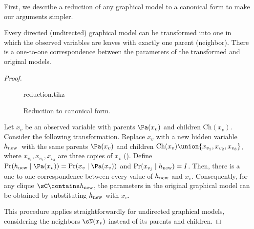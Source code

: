 


First, we describe a reduction of any graphical model to
  a canonical form to make our arguments simpler.

\begin{lemma}
  \label{lem:reduction}
Every directed (undirected) graphical model can be transformed into one in which
  the observed variables are leaves with exactly one parent (neighbor). 
There is a one-to-one correspondence between the parameters of the
  transformed and original models.
\end{lemma}
\begin{proof}
  \begin{figure}
    \centering
    {reduction.tikz}
    \caption{Reduction to canonical form.}
    \label{fig:reduction}
  \end{figure}

  \providecommand{\hp}{\ensuremath{h_\text{\rm new}}}
  Let $x_v$ be an observed variable with parents $\Pa(x_v)$ and children $\text{Ch}(x_v)$.
  Consider the following transformation.
  Replace $x_v$ with a new hidden variable \hp\ with the same
  parents $\Pa(x_v)$ and children $\text{Ch}(x_v) \union \{x_{v_1}, x_{v_2}, x_{v_3}\}$,
  where $x_{v_1},x_{v_2},x_{v_3}$ are three copies of $x_v$
  ().
  Define $\Pr(\hp \mid \Pa(x_v)) = \Pr(x_v \mid \Pa(x_v))$ and
  $\Pr(x_{v_j} \mid \hp) = I$.
  Then, there is a one-to-one correspondence between every value of
  $\hp$ and $x_v$. Consequently, for any clique $\sC \contains \hp$, the
  parameters in the original graphical model can be obtained by
  substituting $\hp$ with $x_v$.

  This procedure applies straightforwardly for undirected graphical
  models, considering the neighbors $\sN(x_v)$ instead of its parents
  and children.
\end{proof}


